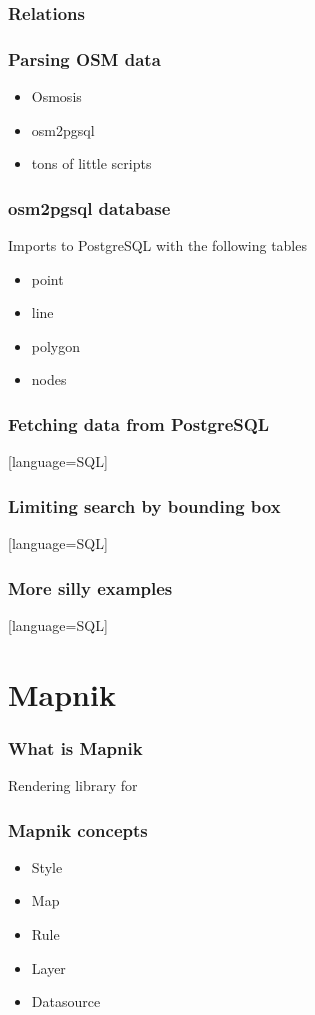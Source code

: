 \documentclass{beamer}
\begin{document}
\begin{frame}
  \frametitle{Relations}
  
\end{frame}

\begin{frame}
  \frametitle{Parsing OSM data}
  \begin{itemize}
  \item Osmosis
  \item osm2pgsql
  \item tons of little scripts
  \end{itemize}
\end{frame}

\begin{frame}
  \frametitle{osm2pgsql database}
  Imports to PostgreSQL with the following tables
  \begin{itemize}
  \item point
  \item line
  \item polygon
  \item nodes
  \end{itemize}
\end{frame}

\begin{frame}
  \frametitle{Fetching data from PostgreSQL}
  [language=SQL]
\end{frame}

\begin{frame}
  \frametitle{Limiting search by bounding box}
  [language=SQL]
\end{frame}

\begin{frame}
  \frametitle{More silly examples}
  [language=SQL]
\end{frame}

\section{Mapnik}

\begin{frame}
  \frametitle{What is Mapnik}
  Rendering library for
\end{frame}

\begin{frame}
  \frametitle{Mapnik concepts}
  \begin{itemize}
  \item Style
  \item Map
  \item Rule
  \item Layer
  \item Datasource
  \end{itemize}
\end{frame}
\end{document}

